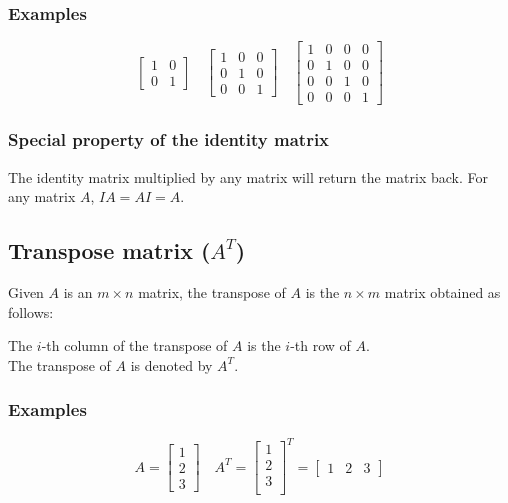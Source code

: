 \documentclass[11pt]{article}
\begin{document}
\subsubsection{Examples}
\label{sec:orga2f1796}
\begin{displaymath}
\begin{bmatrix}
1 & 0 \\
0 & 1
\end{bmatrix} \quad \begin{bmatrix}
1 & 0 & 0 \\
0 & 1 & 0 \\
0 & 0 & 1
\end{bmatrix} \quad \begin{bmatrix}
1 & 0 & 0 & 0 \\
0 & 1 & 0 & 0 \\
0 & 0 & 1 & 0 \\
0 & 0 & 0 & 1
\end{bmatrix}
\end{displaymath}

\subsubsection{Special property of the identity matrix}
\label{sec:org0dfb09b}
The identity matrix multiplied by any matrix will return the matrix back. For any matrix \(A\), \(IA = AI = A\).

\subsection{Transpose matrix (\(A^T\))}
\label{sec:orgc9c1272}
Given \(A\) is an \(m \times n\) matrix, the transpose of \(A\) is the \(n \times m\) matrix obtained as follows:

The \(i\)-th column of the transpose of \(A\) is the \(i\)-th row of \(A\).
\\[0pt]

The transpose of \(A\) is denoted by \(A^T\).

\subsubsection{Examples}
\label{sec:org9835437}
\begin{displaymath}
A = \begin{bmatrix}
1 \\
2 \\
3
\end{bmatrix} \quad A^{T} = \begin{bmatrix}
1 \\
2 \\
3 \\
\end{bmatrix}^{T} = \begin{bmatrix}
1 & 2 & 3
\end{bmatrix}
\end{displaymath}
\end{document}
